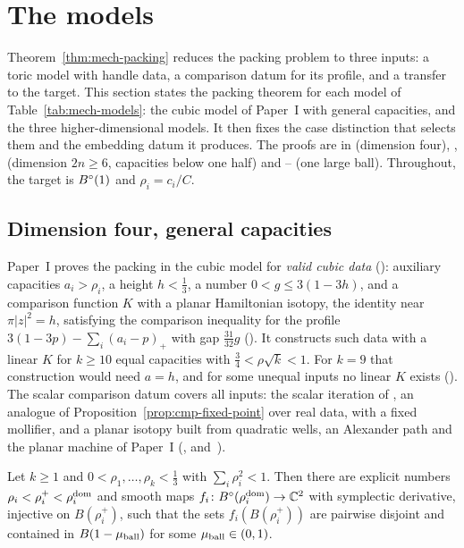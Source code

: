 \section{The models}\label{p2:sec-models}

Theorem~\ref{thm:mech-packing} reduces the packing problem to three inputs: a toric model with handle data, a
comparison datum for its profile, and a transfer to the target. This section states the packing theorem for each
model of Table~\ref{tab:mech-models}: the cubic model of Paper~I with general capacities, and the three
higher-dimensional models. It then fixes the case distinction that selects them and the embedding datum it produces.
The proofs are in  (dimension four), ,  (dimension $2n\ge6$,
capacities below one half) and -- (one large ball). Throughout, the target is $B^{\circ}(1)$ and
$\rho_i=c_i/C$.

\subsection{Dimension four, general capacities}\label{sec:mdl-four}

Paper~I proves the packing in the cubic model for \emph{valid cubic data} (): auxiliary
capacities $a_i>\rho_i$, a height $h<\frac13$, a number $0<g\le3(1-3h)$, and a comparison function $K$ with a planar
Hamiltonian isotopy, the identity near $\pi|z|^2=h$, satisfying the comparison inequality for the profile
$3(1-3p)-\sum_i(a_i-p)_+$ with gap $\frac{31}{32}g$ (). It constructs such data with a linear
$K$ for $k\ge10$ equal capacities with $\frac34<\rho\sqrt k<1$. For $k=9$ that construction would need $a=h$, and for
some unequal inputs no linear $K$ exists (). The scalar comparison datum covers all
inputs: the scalar iteration of , an analogue of Proposition~\ref{prop:cmp-fixed-point}
over real data, with a fixed mollifier, and a planar isotopy
built from quadratic wells, an Alexander path and the planar machine of Paper~I
(,  and~).

\begin{theorem}\label{thm:mdl-cub-general}
Let $k\ge1$ and $0<\rho_1,\dots,\rho_k<\frac13$ with $\sum_i\rho_i^2<1$. Then there are explicit numbers
$\rho_i<\rho_i^+<\rho_i^{\rm dom}$ and smooth maps $f_i\colon B^{\circ}(\rho_i^{\rm dom})\to\mathbb{C}^2$ with symplectic derivative,
injective on $B(\rho_i^+)$, such that the sets $f_i(B(\rho_i^+))$ are pairwise disjoint and contained in
$B(1-\mu_{\rm ball})$ for some $\mu_{\rm ball}\in(0,1)$.
\end{theorem}


